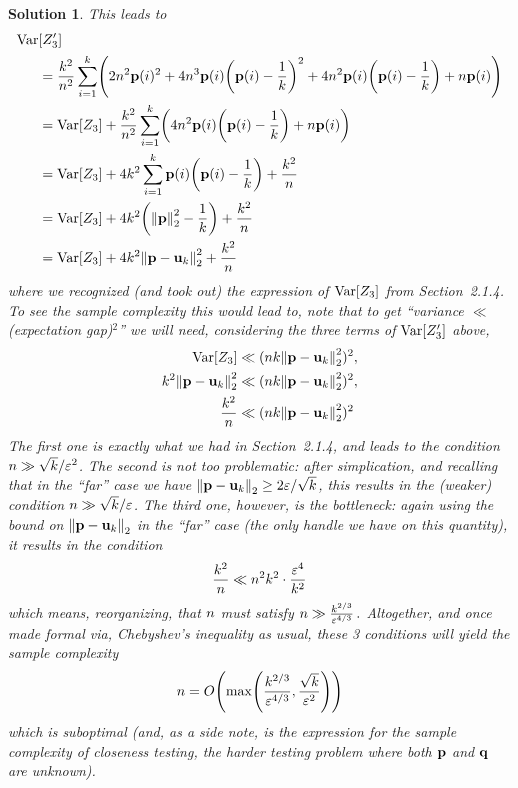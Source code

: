 \documentclass[biber,plain]{nowfnt} %
\newtheorem{solution}{Solution}[chapter]
\begin{document}
\begin{solution}
This leads to
\begin{align*}
      \Var&[Z'_3] \\
      &= \frac{\ab^2}{\ns^2}\sum_{i=1}^\ab \Paren{2\ns^2\p (i)^2 + 4\ns^3\p(i)\Paren{\p(i)-\frac{1}{\ab}} ^2 + 4\ns^2\p(i)\Paren{\p(i)-\frac{1}{\ab}} + \ns\p(i)} \\
      &= \Var[Z_3] + \frac{\ab^2}{\ns^2}\sum_{i=1}^\ab \Paren{4\ns^2\p(i)\Paren{\p(i)-\frac{1}{\ab}} + \ns\p(i)} \\
      &= \Var[Z_3] + 4\ab^2\sum_{i=1}^\ab \p(i)\Paren{\p(i)-\frac{1}{\ab}} + \frac{\ab^2}{\ns}\\
      &= \Var[Z_3] + 4\ab^2\Paren{\normtwo{\p}^2 - \frac{1}{\ab}} + \frac{\ab^2}{\ns} \\
      &= \Var[Z_3] + 4\ab^2\normtwo{\p - \uniformOn{\ab}}^2 + \frac{\ab^2}{\ns}
\end{align*}
where we recognized (and took out) the expression of $\operatorname{Var}[Z_3]$ from Section~2.1.4. To see the sample complexity this would lead to, note that to get ``variance $\ll$ (expectation gap)$^2$'' we will need, considering the three terms of $\operatorname{Var}[Z'_3]$ above,
\begin{align*}
		\Var[Z_3] &\ll (\ns\ab\normtwo{\p-\uniform_\ab}^2)^2,  \\
		\ab^2\normtwo{\p - \uniformOn{\ab}}^2 &\ll (\ns\ab\normtwo{\p-\uniform_\ab}^2)^2,  \\
		\frac{\ab^2}{\ns} &\ll (\ns\ab\normtwo{\p-\uniform_\ab}^2)^2
\end{align*}
The first one is exactly what we had in Section~2.1.4, and leads to the condition $n \gg \sqrt{k}/\varepsilon^2$. The second is not too problematic: after simplication, and recalling that in the ``far'' case we have $\normtwo{\p-\uniform_\ab} \geq 2\dst/\sqrt{\ab}$, this results in the (weaker) condition $n \gg \sqrt{k}/\varepsilon$. The third one, however, is the bottleneck: again using the bound on $\normtwo{\p-\uniform_\ab}$ in the ``far'' case (the only handle we have on this quantity), it results in the condition
\[
		\frac{k^2}{n} \ll n^2k^2 \cdot \frac{\varepsilon^4}{k^2}
\]
which means, reorganizing, that $n$ must satisfy
$
	n \gg \frac{k^{2/3}}{\varepsilon^{4/3}}\,.
$ Altogether, and once made formal via, \eg Chebyshev's inequality as usual, these 3 conditions will yield the sample complexity 
\[
		\ns = \bigO{ \max\Paren{\frac{\ab^{2/3}}{\dst^{4/3}},\frac{\sqrt{\ab}}{\dst^2}} }
\]
which is suboptimal (and, as a side note, is the expression for the sample complexity of \emph{closeness} testing, the harder testing problem where both $\mathbf{p}$ and $\mathbf{q}$ are unknown).
\end{solution}
\end{document}
